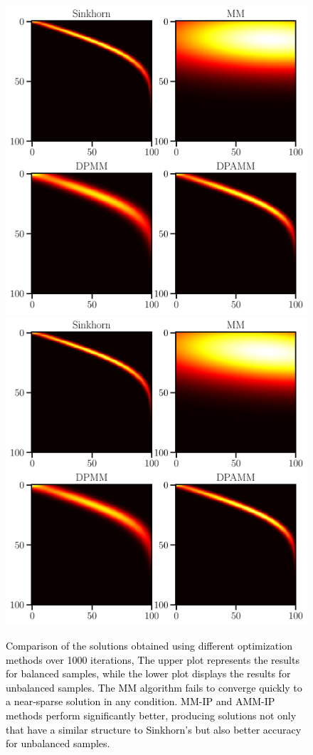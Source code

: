 \documentclass[conference]{IEEEtran}
\newcommand{\changeSX}[1]{\textcolor{black}{#1}}
\begin{document}
\begin{figure}[tp]
\centering
\includegraphics[width = 0.99\linewidth]{pic/ex2}
\centering
\includegraphics[width = 0.99\linewidth]{pic/ex4}
\setlength{\belowcaptionskip}{-30pt}
\caption{\changeSX{Comparison of the solutions obtained using different optimization methods over 1000 iterations, The upper plot represents the results for balanced samples, while the lower plot displays the results for unbalanced samples. The MM algorithm fails to converge quickly to a near-sparse solution in any condition. MM-IP and AMM-IP methods perform significantly better, producing solutions not only that have a similar structure to Sinkhorn's but also better accuracy for unbalanced samples.}}
\label{Fig:ex2}
\end{figure}
\end{document}
